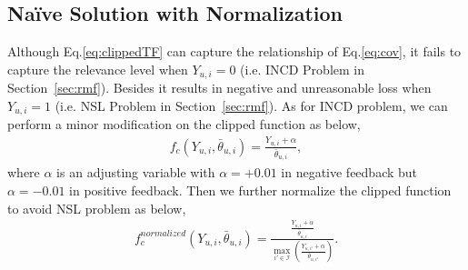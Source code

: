 \documentclass[sigconf]{acmart}
\begin{document}
\subsection{Na\"ive Solution with Normalization}\label{sec:navie}
Although Eq.\eqref{eq:clippedTF} can capture the relationship of Eq.\eqref{eq:cov}, it fails to capture the relevance level when $Y_{u,i} = 0$ (i.e. INCD Problem in Section~\ref{sec:rmf}). Besides it results in negative and unreasonable loss  when $Y_{u,i} = 1$ (i.e. NSL Problem in Section~\ref{sec:rmf}). As for INCD problem, we can perform a minor modification on the clipped function as below, 
\begin{eqnarray}\label{eq:clippedTFModified}
	f_{c}({Y_{u,i}}, {\bar{\theta}_{u,i}}) =  \frac{Y_{u,i} + \alpha}{\bar{\theta}_{u,i}},
\end{eqnarray}
where $\alpha$ is an adjusting variable with $\alpha = +0.01$ in negative feedback but $\alpha = -0.01$ in positive feedback. Then we further normalize the clipped function to avoid NSL problem as below,
\begin{eqnarray}\label{eq:clippedTFNormalized}
	f^{normalized}_{c}({Y_{u,i}}, {\bar{\theta}_{u,i}}) =  \frac{\frac{Y_{u,i} + \alpha}{\bar{\theta}_{u,i}}}{\max_{i' \in \mathcal{I}} \left(\frac{Y_{u,i'} + \alpha}{\bar{\theta}_{u,i'}}\right)}.
\end{eqnarray}
\end{document}

